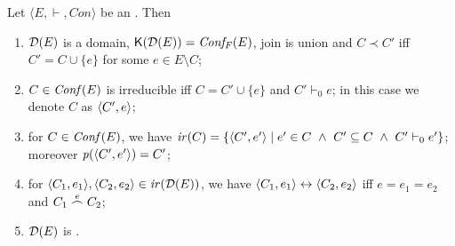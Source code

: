 \begin{lemma}
  \label{le:es-to-fusion-domain}
  Let $\langle E, \vdash, Con \rangle$ be an {\esabbr}.
  Then
  \begin{enumerate}

  \item 
    \label{le:es-to-fusion-domain:1}
    $\mathcal{D}({{E}})$ is a domain,
    $\mathop{\mathsf{K}({\mathcal{D}({{E}})})} = \mathit{Conf_F}({{E}})$, join is union and
    $C \prec C'$ iff {$C' = C \cup \{ e \}$
    for some $e \in E \setminus C$};

  \item
    \label{le:es-to-fusion-domain:2}
    $C \in \mathit{Conf}({{E}})$ is irreducible iff $C = C' \cup \{ e \}$ and
    $C' \vdash_0 e$; in this case we denote $C$ as $\langle{C'}, {e}\rangle$;

  \item 
    \label{le:es-to-fusion-domain:3}
    for $C \in \mathit{Conf}({{E}})$, we have
    $\mathop{\mathit{ir}({C})} = \{ \langle{C'}, {e'}\rangle \mid e' \in C\ \land\ C' \subseteq C\
    \land\ C' \vdash_0 e' \}$; moreover $\mathit{p}({\langle{C'}, {e'}\rangle}) = C'$;

  \item 
    \label{le:es-to-fusion-domain:4}
%
    for $\langle{C_1}, {e_1}\rangle, \langle{C_2}, {e_2}\rangle \in \mathop{\mathit{ir}({\mathcal{D}({{E}})})}$, we have
    $\langle{C_1}, {e_1}\rangle \leftrightarrow \langle{C_2}, {e_2}\rangle$ iff $e = e_1 = e_2$
    and $C_1 \stackrel{e}{\frown} C_2$;
    
  \item
    \label{le:es-to-fusion-domain:5}
    $\mathcal{D}({E})$ is {\wi}.

  \end{enumerate}
\end{lemma}

